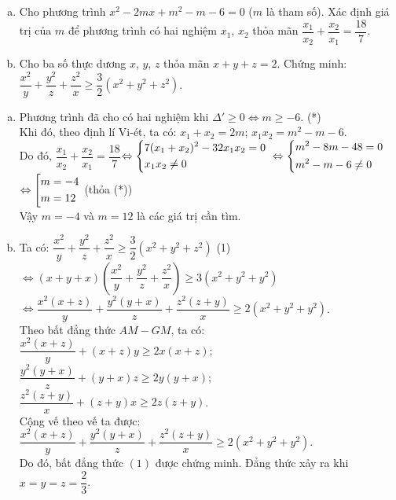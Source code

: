 \begin{ex}%
	\hfill
	\begin{enumerate}[a)]
		\item Cho phương trình $x^2-2mx+m^2-m-6=0$ ($m$ là tham số). Xác định giá trị của $m$ để phương trình có hai nghiệm $x_1$, $x_2$ thỏa mãn $\dfrac{x_1}{x_2}+\dfrac{x_2}{x_1}=\dfrac{18}{7}$.
		\item Cho ba số thực dương $x$, $y$, $z$ thỏa mãn $x+y+z=2$. Chứng minh:
		$\dfrac{x^2}{y}+\dfrac{y^2}{z}+\dfrac{z^2}{x}\ge \dfrac{3}{2}( x^2+y^2+z^2)$.
		\end{enumerate}
	\loigiai
	{
		\begin{enumerate}[a)]
			\item Phương trình đã cho có hai nghiệm khi ${\Delta }'\ge 0\Leftrightarrow m\ge -6$.  (*)\\
			Khi đó, theo định lí Vi-ét, ta có: $x_1+x_2=2m$; $x_1x_2=m^2-m-6$.\\	
			Do đó, $\dfrac{x_1}{x_2}+\dfrac{x_2}{x_1}=\dfrac{18}{7}$$\Leftrightarrow \left\{\begin{aligned}
			& 7( x_1+x_2)^2-32x_1x_2=0 \\
			& x_1x_2\ne 0\end{aligned}\right.$	
			$\Leftrightarrow \left\{\begin{aligned}
			& m^2-8m-48=0 \\
			& m^2-m-6\ne 0\end{aligned}\right.$	
			$\Leftrightarrow \left[\begin{aligned}
			& m=-4 \\
			& m=12\end{aligned}\right.$ (thỏa (*))\\	
			Vậy $m=-4$ và $m=12$ là các giá trị cần tìm.		
			\item Ta có: $\dfrac{x^2}{y}+\dfrac{y^2}{z}+\dfrac{z^2}{x}\ge \dfrac{3}{2}\left( x^2+y^2+z^2 \right)$  (1)
			$\Leftrightarrow \left( x+y+x \right)\left( \dfrac{x^2}{y}+\dfrac{y^2}{z}+\dfrac{z^2}{x} \right)\ge 3\left( x^2+y^2+y^2 \right)$	
			$\Leftrightarrow \dfrac{x^2(x+z)}{y}+\dfrac{y^2(y+x)}{z}+\dfrac{z^2(z+y)}x\ge 2( x^2+y^2+y^2)$.\\	
			Theo bất đẳng thức $AM-GM$, ta có: $\dfrac{x^2(x+z)}{y}+(x+z)y\ge 2x(x+z)$;
			$\dfrac{y^2(y+x)}{z}+(y+x)z\ge 2y(y+x)$; $\dfrac{z^2(z+y)}{x}+(z+y)x\ge 2z(z+y)$.\\
			Cộng vế theo vế ta được: $\dfrac{x^2(x+z)}{y}+\dfrac{y^2(y+x)}{z}+\dfrac{z^2(z+y)}{x}\ge 2\left( x^2+y^2+y^2 \right)$.\\
			Do đó, bất đẳng thức $(1)$ được chứng minh. Đẳng thức xảy ra khi $x=y=z=\dfrac{2}{3}$.					
		\end{enumerate}
	}
\end{ex}

